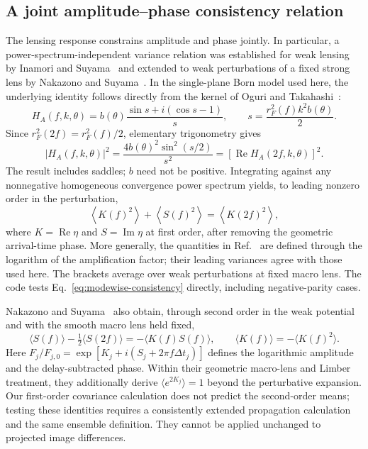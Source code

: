 \subsection{A joint amplitude--phase consistency relation}
\label{sec:kernel-consistency}

The lensing response constrains amplitude and phase jointly.  In
particular, a power-spectrum-independent variance relation was established
for weak lensing by Inamori and Suyama~\cite{inamori2021} and extended to
weak perturbations of a fixed strong lens by Nakazono and
Suyama~\cite{nakazono2026}.  In the single-plane Born model used here,
the underlying identity follows directly from the kernel of
Oguri and Takahashi~\cite{oguri2022}:
\begin{equation}
 H_A(f,k,\theta)=b(\theta)
 \frac{\sin s+i(\cos s-1)}{s},\qquad
 s=\frac{r_F^2(f)k^2b(\theta)}{2}.
\end{equation}
Since $r_F^2(2f)=r_F^2(f)/2$, elementary trigonometry gives
\begin{equation}
 |H_A(f,k,\theta)|^2
 =\frac{4b(\theta)^2\sin^2(s/2)}{s^2}
 =\left[\operatorname{Re}H_A(2f,k,\theta)\right]^2.
 \label{eq:modewise-consistency}
\end{equation}
The result includes saddles; $b$ need not be positive.  Integrating
against any nonnegative homogeneous convergence power spectrum yields,
to leading nonzero order in the perturbation,
\begin{equation}
 \left\langle K(f)^2\right\rangle+
 \left\langle S(f)^2\right\rangle
 =\left\langle K(2f)^2\right\rangle,
 \label{eq:ensemble-consistency}
\end{equation}
where $K=\operatorname{Re}\eta$ and $S=\operatorname{Im}\eta$ at first
order, after removing the geometric arrival-time phase.  More generally,
the quantities in Ref.~\cite{nakazono2026} are defined through the
logarithm of the amplification factor; their leading variances agree
with those used here.  The brackets average over weak perturbations at
fixed macro lens.  The code tests Eq.~\eqref{eq:modewise-consistency}
directly, including negative-parity cases.

Nakazono and Suyama~\cite{nakazono2026} also obtain, through second
order in the weak potential and with the smooth macro lens held fixed,
\begin{equation}
 \langle S(f)\rangle-\tfrac12\langle S(2f)\rangle
   =-\langle K(f)S(f)\rangle,\qquad
 \langle K(f)\rangle=-\langle K(f)^2\rangle.
\end{equation}
Here $F_j/F_{j,0}=\exp[K_j+i(S_j+2\pi f\Delta t_j)]$ defines the
logarithmic amplitude and the delay-subtracted phase.  Within their
geometric macro-lens and Limber treatment, they additionally derive
$\langle e^{2K_j}\rangle=1$ beyond the perturbative expansion.
Our first-order covariance calculation does not predict the second-order
means; testing these identities requires a consistently extended
propagation calculation and the same ensemble definition.  They cannot
be applied unchanged to projected image differences.

